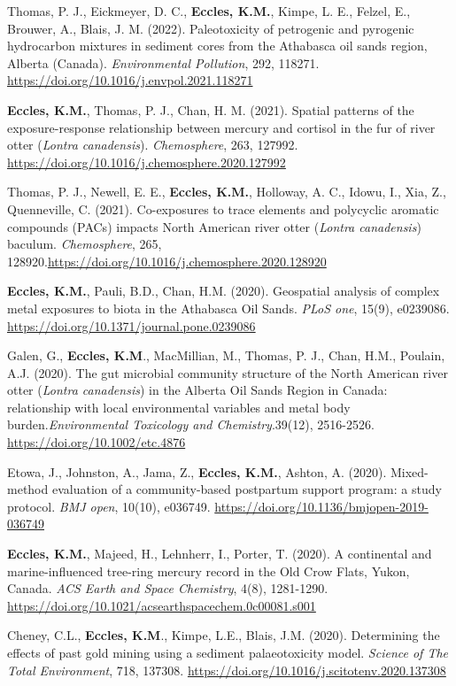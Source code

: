 \documentclass[margin,line]{res}
\begin{document}
\begin{resume}
 Thomas, P. J., Eickmeyer, D. C., \textbf{Eccles, K.M.}, Kimpe, L. E., Felzel, E., Brouwer, A., Blais, J. M. (2022). Paleotoxicity of petrogenic and pyrogenic hydrocarbon mixtures in sediment cores from the Athabasca oil sands region, Alberta (Canada). \textit{Environmental Pollution}, 292, 118271. \url{https://doi.org/10.1016/j.envpol.2021.118271}

\textbf{Eccles, K.M.}, Thomas, P. J., Chan, H. M. (2021). Spatial patterns of the exposure-response relationship between mercury and cortisol in the fur of river otter (\textit{Lontra canadensis}). \textit{Chemosphere}, 263, 127992. \url{https://doi.org/10.1016/j.chemosphere.2020.127992}

Thomas, P. J., Newell, E. E., \textbf{Eccles, K.M.}, Holloway, A. C., Idowu, I., Xia, Z., Quenneville, C. (2021). Co-exposures to trace elements and polycyclic aromatic compounds (PACs) impacts North American river otter (\textit{Lontra canadensis}) baculum. \textit{Chemosphere}, 265, 128920.\url{https://doi.org/10.1016/j.chemosphere.2020.128920}

\textbf{Eccles, K.M.}, Pauli, B.D., Chan, H.M. (2020). Geospatial analysis of complex metal exposures to biota in the Athabasca Oil Sands. \textit{PLoS one}, 15(9), e0239086. \url{https://doi.org/10.1371/journal.pone.0239086}

Galen, G., \textbf{Eccles, K.M}., MacMillian, M., Thomas, P. J., Chan, H.M., Poulain, A.J. (2020). The gut microbial community structure of the North American river otter (\textit{Lontra canadensis}) in the Alberta Oil Sands Region in Canada: relationship with local environmental variables and metal body burden.\textit{Environmental Toxicology and Chemistry}.39(12), 2516-2526. \url{https://doi.org/10.1002/etc.4876}

Etowa, J., Johnston, A., Jama, Z., \textbf{Eccles, K.M.}, Ashton, A. (2020). Mixed-method evaluation of a community-based postpartum support program: a study protocol. \textit{BMJ open}, 10(10), e036749. \url{https://doi.org/10.1136/bmjopen-2019-036749}

\textbf{Eccles, K.M.}, Majeed, H., Lehnherr, I., Porter, T. (2020). A continental and marine-influenced tree-ring mercury record in the Old Crow Flats, Yukon, Canada. \textit{ACS Earth and Space Chemistry}, 4(8), 1281-1290. \url{https://doi.org/10.1021/acsearthspacechem.0c00081.s001}

Cheney, C.L., \textbf{Eccles, K.M}., Kimpe, L.E., Blais, J.M. (2020). Determining the effects of past gold mining using a sediment palaeotoxicity model. \textit{Science of The Total Environment}, 718, 137308. \url{https://doi.org/10.1016/j.scitotenv.2020.137308}


\end{resume}
\end{document}
